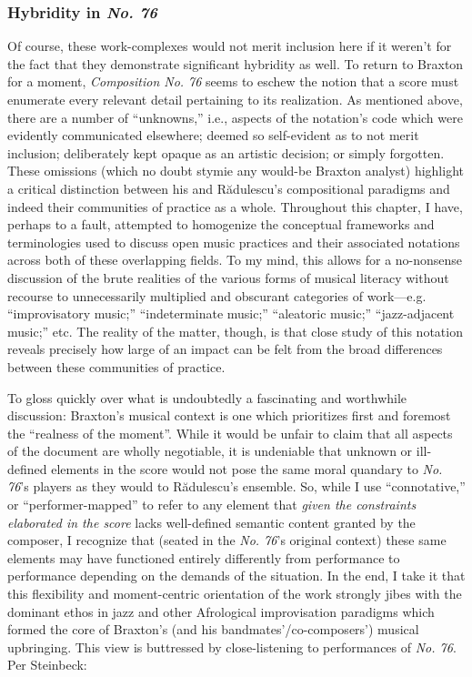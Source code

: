 
    \subsubsection{Hybridity in \textit{No. 76}}

        Of course, these work-complexes would not merit inclusion here if it weren't for the fact that they demonstrate significant hybridity as well. To return to Braxton for a moment, \textit{Composition No. 76} seems to eschew the notion that a score must enumerate every relevant detail pertaining to its realization. As mentioned above, there are a number of ``unknowns,'' i.e., aspects of the notation's code which were evidently communicated elsewhere; deemed so self-evident as to not merit inclusion; deliberately kept opaque as an artistic decision; or simply forgotten. These omissions (which no doubt stymie any would-be Braxton analyst) highlight a critical distinction between his and R\u{a}dulescu's compositional paradigms and indeed their communities of practice as a whole. Throughout this chapter, I have, perhaps to a fault, attempted to homogenize the conceptual frameworks and terminologies used to discuss open music practices and their associated notations across both of these overlapping fields. To my mind, this allows for a no-nonsense discussion of the brute realities of the various forms of musical literacy without recourse to unnecessarily multiplied and obscurant categories of work---e.g. ``improvisatory music;'' ``indeterminate music;'' ``aleatoric music;'' ``jazz-adjacent music;'' etc. The reality of the matter, though, is that close study of this notation reveals precisely how large of an impact can be felt from the broad differences between these communities of practice.

        To gloss quickly over what is undoubtedly a fascinating and worthwhile discussion: Braxton's musical context is one which prioritizes first and foremost the ``realness of the moment''.\autocite[149]{Braxton_1988} While it would be unfair to claim that all aspects of the document are wholly negotiable, it is undeniable that unknown or ill-defined elements in the score would not pose the same moral quandary to \textit{No. 76}'s players as they would to R\u{a}dulescu's ensemble. So, while I use ``connotative,'' or ``performer-mapped'' to refer to any element that \textit{given the constraints elaborated in the score} lacks well-defined semantic content granted by the composer, I recognize that (seated in the \textit{No. 76}'s original context) these same elements may have functioned entirely differently from performance to performance depending on the demands of the situation. In the end, I take it that this flexibility and moment-centric orientation of the work strongly jibes with the dominant ethos in jazz and other Afrological improvisation paradigms which formed the core of Braxton's (and his bandmates'/co-composers') musical upbringing. This view is buttressed by close-listening to performances of \textit{No. 76}. Per Steinbeck:

